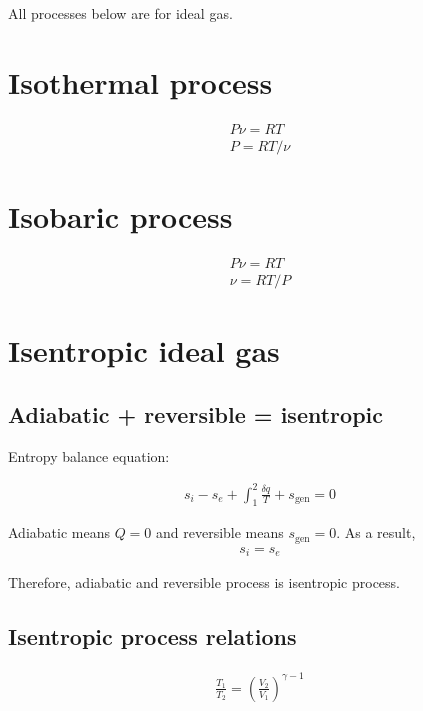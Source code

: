 \documentclass{article}
\begin{document}
    All processes below are for ideal gas.
	
		\section{Isothermal process}
		
		\begin{align*}
			P\nu = RT\\
			P = RT/\nu			
		\end{align*}

		\section{Isobaric process}
		
		\begin{align*}
			P\nu = RT\\
            \nu = RT/P
		\end{align*}
	
		\section{Isentropic ideal gas}
		
		\subsection{Adiabatic + reversible = isentropic}
		
		Entropy balance equation:
		
		\begin{align*}
			s_i - s_e + \int_1^2\frac{\delta q}{T} + s_\text{gen} = 0			
		\end{align*}
	
		
	
		Adiabatic means $Q=0$ and reversible means $s_\text{gen}=0$. As a result,
		\begin{align*}
			s_i = s_e
		\end{align*}
	
		Therefore, adiabatic and reversible process is isentropic process.
		
		\subsection{Isentropic process relations}
	
		\begin{align*}
			\frac{T_1}{T_2} = \left(\frac{V_2}{V_1}\right)^{\gamma-1}
		\end{align*}
	
\end{document}
